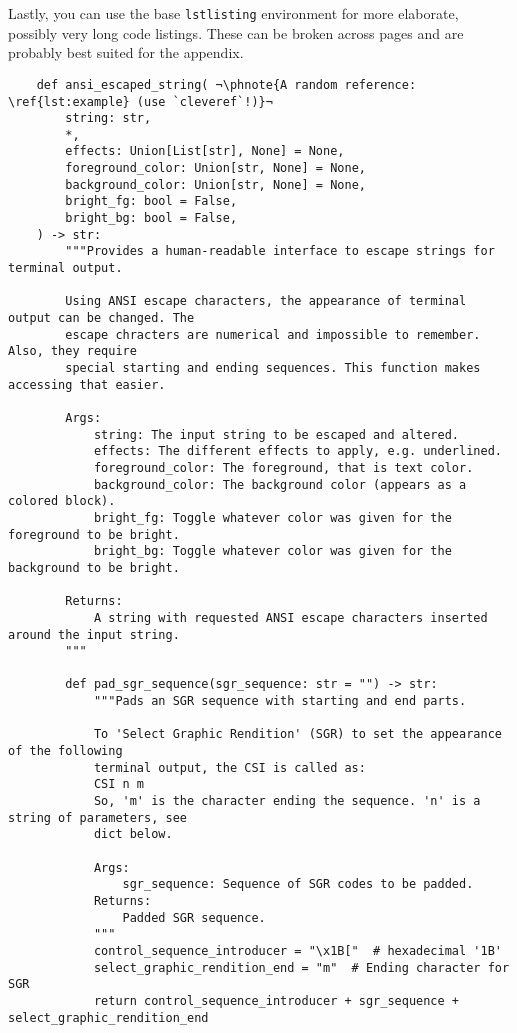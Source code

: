 Lastly, you can use the base \texttt{lstlisting} environment for more elaborate,
possibly very long code listings.
These can be broken across pages and are probably best suited for the appendix.
\begin{lstlisting}
    def ansi_escaped_string( ¬\phnote{A random reference: \ref{lst:example} (use `cleveref`!)}¬
        string: str,
        *,
        effects: Union[List[str], None] = None,
        foreground_color: Union[str, None] = None,
        background_color: Union[str, None] = None,
        bright_fg: bool = False,
        bright_bg: bool = False,
    ) -> str:
        """Provides a human-readable interface to escape strings for terminal output.
    
        Using ANSI escape characters, the appearance of terminal output can be changed. The
        escape chracters are numerical and impossible to remember. Also, they require
        special starting and ending sequences. This function makes accessing that easier.
    
        Args:
            string: The input string to be escaped and altered.
            effects: The different effects to apply, e.g. underlined.
            foreground_color: The foreground, that is text color.
            background_color: The background color (appears as a colored block).
            bright_fg: Toggle whatever color was given for the foreground to be bright.
            bright_bg: Toggle whatever color was given for the background to be bright.
    
        Returns:
            A string with requested ANSI escape characters inserted around the input string.
        """
    
        def pad_sgr_sequence(sgr_sequence: str = "") -> str:
            """Pads an SGR sequence with starting and end parts.
    
            To 'Select Graphic Rendition' (SGR) to set the appearance of the following
            terminal output, the CSI is called as:
            CSI n m
            So, 'm' is the character ending the sequence. 'n' is a string of parameters, see
            dict below.
    
            Args:
                sgr_sequence: Sequence of SGR codes to be padded.
            Returns:
                Padded SGR sequence.
            """
            control_sequence_introducer = "\x1B["  # hexadecimal '1B'
            select_graphic_rendition_end = "m"  # Ending character for SGR
            return control_sequence_introducer + sgr_sequence + select_graphic_rendition_end
    

\end{lstlisting}
